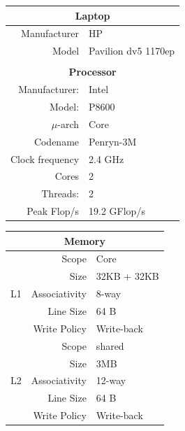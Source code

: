 \begin{table}[!htp]

\begin{minipage}[t]{0.5\linewidth}
	\vspace{0pt}
		\begin{tabular}{|rl|}
			\multicolumn{2}{c}{\textbf{Laptop}}				\\
			\hline
				Manufacturer		&	HP					\\
				Model				&	Pavilion dv5 1170ep	\\
			\hline
			\multicolumn{2}{c}{} 							\\
			\multicolumn{2}{c}{\textbf{Processor}} 			\\
			\hline
				Manufacturer:		&	Intel				\\
				Model:				&	P8600				\\
				$\mu$-arch			&	Core				\\
				Codename			&	Penryn-3M			\\
				Clock frequency		&	2.4 GHz				\\
				Cores				&	2					\\
				Threads:			&	2					\\
				Peak Flop/s			&	19.2 GFlop/s		\\
			\hline
		\end{tabular}

\end{minipage}
\begin{minipage}[t]{0.5\linewidth}
	\vspace{0pt}

		\begin{tabular}{|c|rl|}
			\multicolumn{3}{c}{\textbf{Memory}}		\\
			\hline
			\multicolumn{1}{|c|}{\multirow{5}{*}{L1}}
				&	Scope			&	Core		\\
				&	Size			&	32KB + 32KB	\\
				&	Associativity	&	8-way		\\
				&	Line Size		&	64 B		\\
				&	Write Policy	&	Write-back	\\
			\hline
			\multicolumn{1}{|c|}{\multirow{5}{*}{L2}}
				&	Scope			&	shared		\\
				&	Size			&	3MB			\\
				&	Associativity	&	12-way		\\
				&	Line Size		&	64 B		\\
				&	Write Policy	&	Write-back	\\
			\hline


\end{tabular}
\end{minipage}
\end{table}
